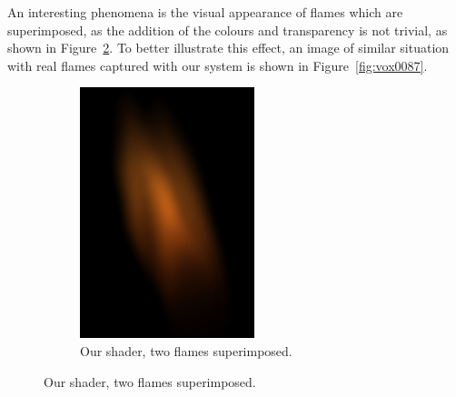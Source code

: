 An interesting phenomena is the visual appearance of flames which are superimposed, as the addition of the colours and transparency is not trivial, as shown in Figure~\ref{fig:result_synthetic}.
To better illustrate this effect, an image of similar situation  with real flames captured with our system is shown in Figure~\ref{fig:vox0087}.

\begin{figure}[h!]
        \centering
        \begin{subfigure}[t]{0.2\textwidth}
                \includegraphics[width=\textwidth]{img/result_synthetic}
                \caption{Our shader, two flames superimposed.}
                \label{fig:result_synthetic}
        \end{subfigure}%
        \qquad %

\end{figure}
